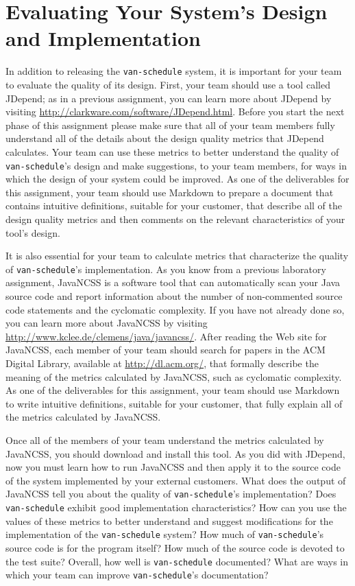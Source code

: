 \section*{Evaluating Your System's Design and Implementation}

In addition to releasing the {\tt van-schedule} system, it is important for your team to evaluate the quality of its
design.  First, your team should use a tool called JDepend; as in a previous assignment, you can learn more about
JDepend by visiting \url{http://clarkware.com/software/JDepend.html}.  Before you start the next phase of this
assignment please make sure that all of your team members fully understand all of the details about the design quality
metrics that JDepend calculates.  Your team can use these metrics to better understand the quality of {\tt
van-schedule}'s design and make suggestions, to your team members, for ways in which the design of your system could be
improved.  As one of the deliverables for this assignment, your team should use Markdown to prepare a document that
contains intuitive definitions, suitable for your customer, that describe all of the design quality metrics and then
comments on the relevant characteristics of your tool's design.

It is also essential for your team to calculate metrics that characterize the quality of {\tt van-schedule}'s implementation.
As you know from a previous laboratory assignment, JavaNCSS is a software tool that can automatically scan your Java
source code and report information about the number of non-commented source code statements and the cyclomatic
complexity.  If you have not already done so, you can learn more about JavaNCSS by visiting
\url{http://www.kclee.de/clemens/java/javancss/}. After reading the Web site for JavaNCSS, each member of your team
should search for papers in the ACM Digital Library, available at \url{http://dl.acm.org/}, that formally describe the
meaning of the metrics calculated by JavaNCSS, such as cyclomatic complexity. As one of the deliverables for this
assignment, your team should use Markdown to write intuitive definitions, suitable for your customer, that fully explain all of the
metrics calculated by JavaNCSS.

Once all of the members of your team understand the metrics calculated by JavaNCSS, you should download and install this
tool.  As you did with JDepend, now you must learn how to run JavaNCSS and then apply it to the source code of the
system implemented by your external customers.  What does the output of JavaNCSS tell you about the quality of
{\tt van-schedule}'s implementation? Does {\tt van-schedule} exhibit good implementation characteristics? How can you use the
values of these metrics to better understand and suggest modifications for the implementation of the {\tt van-schedule}
system? How much of {\tt van-schedule}'s source code is for the program itself? How much of the source code is devoted to the
test suite?  Overall, how well is {\tt van-schedule} documented? What are ways in which your team can improve {\tt van-schedule}'s
documentation?


